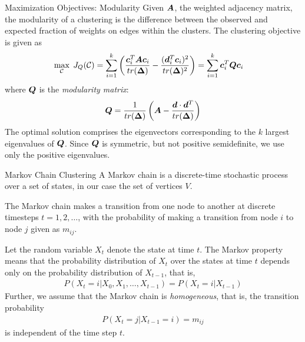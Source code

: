 \begin{frame}{Maximization Objectives: Modularity}
Given ${\boldsymbol A}$, the weighted adjacency
matrix, the modularity of a clustering is the
difference between the observed and expected fraction of weights
on edges within the clusters. 
The clustering objective is given as
\begin{align*}
    \max_{{\mathcal C}} \; J_{Q}({\mathcal C}) &= \sum_{i=1}^k
    \left( {{\boldsymbol c}_i^T {\boldsymbol A} {\boldsymbol c}_i \over tr({\bm \Delta})} -
        {({\boldsymbol d}_i^T {\boldsymbol c}_i)^2 \over tr({\bm \Delta})^2}
    \right)
    = \sum_{i=1}^k {\boldsymbol c}_i^T {\boldsymbol Q} {\boldsymbol c}_i
\end{align*}
where ${\boldsymbol Q}$ is the {\em modularity matrix}:
\begin{align*}
    {\boldsymbol Q} = {1 \over tr({\bm \Delta})} \left({\boldsymbol A} - {{\boldsymbol d} \cdot
    {\boldsymbol d}^T \over tr({\bm \Delta})} \right)
\end{align*}
The optimal solution comprises the eigenvectors corresponding to the $k$
largest eigenvalues of ${\boldsymbol Q}$.
Since ${\boldsymbol Q}$ is
symmetric, but not positive semidef\/{i}nite, we use only 
the positive eigenvalues.
\end{frame}

\ifdefined\wox \begin{frame} \titlepage \end{frame} \fi

\begin{frame}{Markov Chain Clustering}
A Markov chain is a discrete-time stochastic process
over a set of states, in our case the set of vertices $V$. 

\medskip
The
Markov chain makes a transition from one node to another at
discrete timesteps $t=1,2,\dots$, with the probability of making
a transition from node $i$ to node $j$ given as $m_{ij}$. 

\medskip
Let the
random variable $X_t$ denote the state at time $t$. The Markov
property means that the probability distribution of $X_t$ over the
states at time $t$ depends only on the probability distribution of
$X_{t-1}$, that is,
\begin{align*}
P(X_{t}=i | X_0, X_1, \dots, X_{t-1}) = P(X_{t}=i | X_{t-1})
\end{align*}
Further, we assume that the Markov chain is {\em homogeneous},
that is, the transition probability
\begin{align*}
P(X_t = j | X_{t-1} = i) = m_{ij}
\end{align*}
is independent of the time step $t$.
\end{frame}



